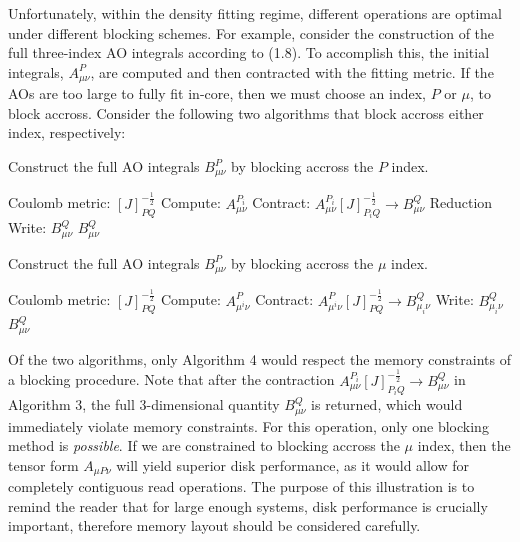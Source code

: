 Unfortunately, within the density fitting regime, different operations are optimal under different blocking schemes. For example,
consider the construction of the full three-index AO integrals according to (1.8). To accomplish this, 
the initial integrals, $A_{\mu \nu}^P$, are computed and then contracted with the fitting metric. If the AOs are too large to fully 
fit in-core, then we must choose an index, $P$ or $\mu$, to block accross. Consider the following two algorithms
that block accross either index, respectively:

\begin{algorithm}[H]
\caption{Construct the full AO integrals $B_{\mu \nu}^P$ by blocking accross the $P$ index.}
\begin{algorithmic}
\REQUIRE Coulomb metric: $[J]_{PQ}^{-\frac{1}{2}}$
    \STATE Compute:  $A_{\mu \nu}^{P_i}$
    \STATE Contract: $A_{\mu \nu}^{P_i} [J]_{P_iQ}^{-\frac{1}{2}} \rightarrow B_{\mu \nu}^Q$
    \STATE Reduction Write:    $B_{\mu \nu}^Q$
\ENDFOR
\RETURN $B_{\mu \nu}^Q$
\end{algorithmic}
\end{algorithm}

\begin{algorithm}[H]
\caption{Construct the full AO integrals $B_{\mu \nu}^P$ by blocking accross the $\mu$ index.}
\begin{algorithmic}
\REQUIRE Coulomb metric: $[J]_{PQ}^{-\frac{1}{2}}$
    \STATE Compute:  $A_{\mu^i \nu}^{P}$
    \STATE Contract: $A_{\mu^i \nu}^{P}[J]_{PQ}^{-\frac{1}{2}} \rightarrow B_{\mu_i \nu}^Q$
    \STATE Write:    $B_{\mu_i \nu}^Q$
\ENDFOR
\RETURN $B_{\mu \nu}^Q$
\end{algorithmic}
\end{algorithm}

Of the two algorithms, only Algorithm 4 would respect the memory constraints of a blocking procedure. Note that after the 
contraction $A_{\mu \nu}^{P_i} [J]_{P_iQ}^{-\frac{1}{2}} \rightarrow B_{\mu \nu}^Q$ in Algorithm 3, the full 3-dimensional quantity
$B_{\mu \nu}^Q$ is returned, which would immediately violate memory constraints. For this operation, only one blocking method is
\textit{possible}. If we are constrained to blocking accross the $\mu$ index, then the tensor form $A_{\mu P \nu}$ will yield
superior disk performance, as it would allow for completely contiguous read operations. The purpose of this illustration is
to remind the reader that for large enough systems, disk performance
is crucially important, therefore memory layout should be considered carefully.

